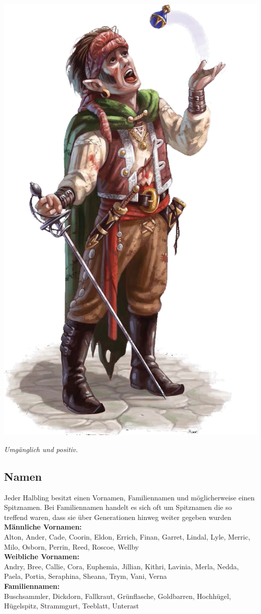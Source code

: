 \includegraphics[width=\textwidth / 3]{img/halbling}

\textit{Umgänglich und positiv.}

\subsection*{Namen}
Jeder Halbling besitzt einen Vornamen, Familiennamen und möglicherweise einen Spitznamen. Bei Familiennamen handelt es sich oft um Spitznamen die so treffend waren, dass sie über Generationen hinweg weiter gegeben wurden\\
\textbf{Männliche Vornamen:}\\
Alton, Ander, Cade, Coorin, Eldon, Errich, Finan, Garret, Lindal, Lyle, Merric, Milo, Osborn, Perrin, Reed, Roscoe, Wellby\\
\textbf{Weibliche Vornamen:}\\
Andry, Bree, Callie, Cora, Euphemia, Jillian, Kithri, Lavinia, Merla, Nedda, Paela, Portia, Seraphina, Sheana, Trym, Vani, Verna\\
\textbf{Familiennamen:}\\
Buschsammler, Dickdorn, Fallkraut, Grünflasche, Goldbarren, Hochhügel, Hügelspitz, Strammgurt, Teeblatt, Unterast

